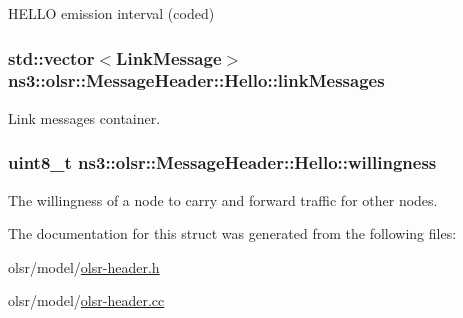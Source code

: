 H\+E\+L\+LO emission interval (coded) 

\subsubsection[{\texorpdfstring{link\+Messages}{linkMessages}}]{\setlength{\rightskip}{0pt plus 5cm}std\+::vector$<${\bf Link\+Message}$>$ ns3\+::olsr\+::\+Message\+Header\+::\+Hello\+::link\+Messages}\hypertarget{structns3_1_1olsr_1_1MessageHeader_1_1Hello_aa6eb8d2a413314c764f5eaf669655f59}{}\label{structns3_1_1olsr_1_1MessageHeader_1_1Hello_aa6eb8d2a413314c764f5eaf669655f59}


Link messages container. 

\subsubsection[{\texorpdfstring{willingness}{willingness}}]{\setlength{\rightskip}{0pt plus 5cm}uint8\+\_\+t ns3\+::olsr\+::\+Message\+Header\+::\+Hello\+::willingness}\hypertarget{structns3_1_1olsr_1_1MessageHeader_1_1Hello_a6458c9b671b767990245f81d1c64c56f}{}\label{structns3_1_1olsr_1_1MessageHeader_1_1Hello_a6458c9b671b767990245f81d1c64c56f}


The willingness of a node to carry and forward traffic for other nodes. 



The documentation for this struct was generated from the following files\+:\begin{DoxyCompactItemize}
\item 
olsr/model/\hyperlink{olsr-header_8h}{olsr-\/header.\+h}\item 
olsr/model/\hyperlink{olsr-header_8cc}{olsr-\/header.\+cc}\end{DoxyCompactItemize}

